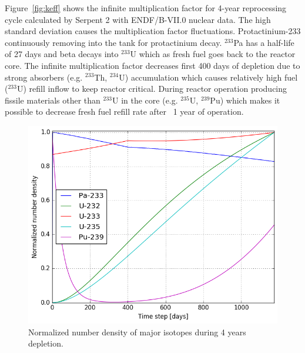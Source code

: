 \documentclass{anstrans}
\begin{document}
\FloatBarrier

Figure~\ref{fig:keff} shows the infinite multiplication factor for 4-year 
reprocessing cycle calculated by Serpent 2 with ENDF/B-VII.0 nuclear data. The 
high standard deviation causes the multiplication factor fluctuations. 
Protactinium-233 continuously removing into the tank for protactinium decay. 
$^{233}$Pa has a half-life of 27 days and beta decays into $^{233}$U which as 
fresh fuel goes back to the reactor core. The infinite multiplication factor 
decreases first 400 days of depletion due to strong absorbers (e.g. $^{233}$Th, 
$^{234}$U) accumulation which causes relatively high fuel ($^{233}$U) refill 
inflow to keep reactor critical. During reactor operation producing fissile 
materials other than $^{233}$U in the core (e.g. $^{235}$U, $^{239}$Pu) which 
makes it possible to decrease fresh fuel refill rate after ~1 year of 
operation.

\begin{figure}[htbp!] %
        \centering
        \includegraphics[width=1.03\linewidth]{fuel_composition.png}
        \caption{Normalized number density of major isotopes during 4 years 
        depletion.}
        \label{fig:compos}
\end{figure}

\FloatBarrier
\end{document}
